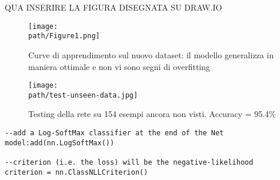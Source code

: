 QUA INSERIRE LA FIGURA DISEGNATA SU DRAW.IO 

\begin{figure}[h!]
 \centering
 \texttt{[image: \\path/Figure1.png]} 
 \caption{Curve di apprendimento sul nuovo dataset: il modello generalizza in maniera ottimale e non vi sono segni di overfitting}
 \label{fig:res-train}
\end{figure}

\begin{figure}[h!]
 \centering
 \texttt{[image: \\path/test-unseen-data.jpg]} 
 \caption{Testing della rete su 154 esempi ancora non visti. Accuracy = 95.4\%}
 \label{fig:res-train}
\end{figure}

\begin{lstlisting}[language={[5.2]Lua}]
--add a Log-SoftMax classifier at the end of the Net
model:add(nn.LogSoftMax())

--criterion (i.e. the loss) will be the negative-likelihood
criterion = nn.ClassNLLCriterion()
\end{lstlisting}
